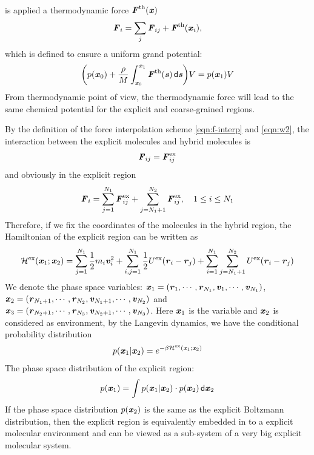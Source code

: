 \documentclass[aps,pre,preprint,unsortedaddress]{revtex4}
\renewcommand{\v}[1]{\textbf{\textit{#1}}}
\renewcommand{\d}[1]{\textsf{#1}}
\begin{document}
is applied a thermodynamic force $\v F^{\textrm{th}}(\v x)$
\begin{align}
  \v F_i = \sum_j\v F_{ij} + \v F^{\textrm{th}}(\v x_i),
\end{align}
which is defined to ensure a uniform grand potential:
\begin{align}
  \bigg(
  p(\v x_0) +
  \frac{\rho}{M}\int_{\v x_0}^{\v x_1}\v F^{\textrm{th}}(\v s)\,\d d\v s
  \bigg) V
  =
  p(\v x_1) V
\end{align}
From thermodynamic point of view, the thermodynamic force will lead
to the same chemical potential for the explicit and coarse-grained regions.

By the definition of the force interpolation scheme
\eqref{eqn:f-interp} and \eqref{eqn:w2}, the interaction between the
explicit molecules and hybrid molecules is
\begin{align}
  \v F_{ij} = \v F^{\textrm{ex}}_{ij}
\end{align}
and obviously in the explicit region
\begin{align}
  \v F_i =
  \sum_{j=1}^{N_1}\v F^{\textrm{ex}}_{ij} + \sum_{j=N_1+1}^{N_2}\v F^{\textrm{ex}}_{ij}, \quad 1\leq i \leq N_1
\end{align}
Therefore, if we fix the coordinates of the molecules in the hybrid
region, the Hamiltonian of the explicit region can be written as
\begin{align}
  \mathcal H^{\textrm{ex}}(\v x_1; \v x_2) =
  \sum_{j=1}^{N_1}\frac12 m_i\v v_i^2 + 
  \sum_{i,j=1}^{N_1}\frac12 U^{\textrm{ex}}(\v r_i - \v r_j) + 
  \sum_{i=1}^{N_1}\sum_{j=N_1+1}^{N_2} U^{\textrm{ex}}(\v r_i - \v r_j) 
\end{align}
We denote the phase space variables: $\v x_1 = (\v r_1, \cdots, \v
r_{N_1}, \v v_1, \cdots, \v v_{N_1})$,  $\v x_2 = (\v r_{N_1+1},
\cdots, \v r_{N_2}, \v v_{N_1+1}, \cdots, \v v_{N_2})$ and
$\v x_3 = (\v r_{N_2+1},
\cdots, \v r_{N_3}, \v v_{N_2+1}, \cdots, \v v_{N_3})$.
Here $\v x_1$ is the variable and $\v x_2$ is considered as environment, 
by the Langevin dynamics, we have the conditional probability distribution
\begin{align}
  p (\v x_1 \vert \v x_2)  =
  e^{-\beta \mathcal H^{\textrm{ex}}(\v x_1; \v x_2)}
\end{align}
The phase space distribution of the explicit region:
\begin{align}
  p(\v x_1) = \int p(\v x_1\vert\v x_2)\cdot p (\v x_2) \,\d d\v x_2
\end{align}
If the phase space distribution $p(\v x_2)$ is the same as the explicit
Boltzmann distribution, then the explicit region is
equivalently embedded in to a explicit molecular environment and can be
viewed as a sub-system of a very big explicit molecular
system.
\end{document}
